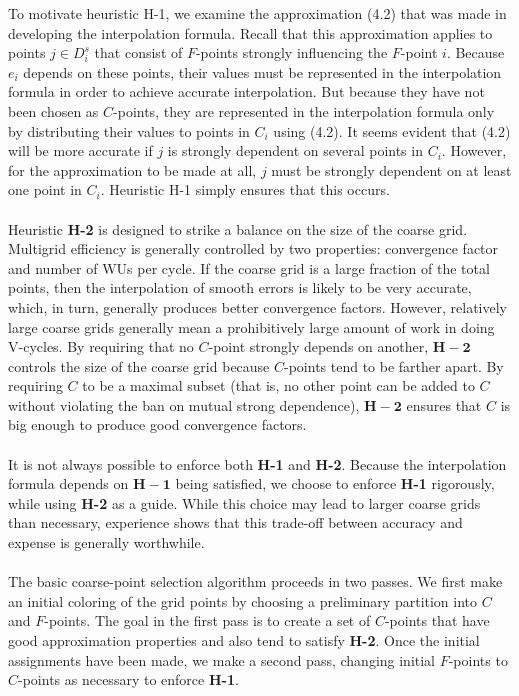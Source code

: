 \documentclass[11pt]{book}
\begin{document}
To motivate heuristic H-1, we examine the approximation (4.2) that was made in developing the interpolation formula. Recall that this approximation applies to points $j \in D_{i}^{s}$ that consist of $F$-points strongly influencing the $F$-point $i$. Because $e_{i}$ depends on these points, their values must be represented in the interpolation formula in order to achieve accurate interpolation. But because they have not been chosen as $C$-points, they are represented in the interpolation formula only by distributing their values to points in $C_{i}$ using (4.2). It seems evident that (4.2) will be more accurate if $j$ is strongly dependent on several points in $C_{i}$. However, for the approximation to be made at all, $j$ must be strongly dependent on at least one point in $C_{i}$. Heuristic H-1 simply ensures that this occurs. \\ \\
Heuristic \textbf{H-2} is designed to strike a balance on the size of the coarse grid. Multigrid efficiency is generally controlled by two properties: convergence factor and number of WUs per cycle. If the coarse grid is a large fraction of the total points, then the interpolation of smooth errors is likely to be very accurate, which, in turn, generally produces better convergence factors. However, relatively large coarse grids generally mean a prohibitively large amount of work in doing V-cycles. By requiring that no $C$-point strongly depends on another, $\mathbf{H-2}$ controls the size of the coarse grid because $C$-points tend to be farther apart. By requiring $C$ to be a maximal subset (that is, no other point can be added to $C$ without violating the ban on mutual strong dependence), $\mathbf{H-2}$ ensures that $C$ is big enough to produce good convergence factors.\\ \\
It is not always possible to enforce both \textbf{H-1} and \textbf{H-2}. Because the interpolation formula depends on $\mathbf{H-1}$ being satisfied, we choose to enforce \textbf{H-1} rigorously, while using \textbf{H-2} as a guide. While this choice may lead to larger coarse grids than necessary, experience shows that this trade-off between accuracy and expense is generally worthwhile. \\ \\
The basic coarse-point selection algorithm proceeds in two passes. We first make an initial coloring of the grid points by choosing a preliminary partition into $C$ and $F$-points. The goal in the first pass is to create a set of $C$-points that have good approximation properties and also tend to satisfy  \textbf{H-2}. Once the initial assignments have been made, we make a second pass, changing initial $F$-points to $C$-points as necessary to enforce \textbf{H-1}.
\end{document}
